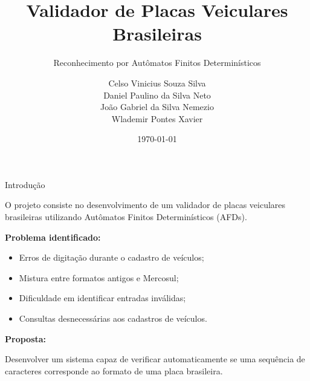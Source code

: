 \documentclass[aspectratio=169,12pt]{beamer}
\title[Validador de Placas]{Validador de Placas Veiculares Brasileiras}
\subtitle{Reconhecimento por Autômatos Finitos Determinísticos}
\author{
    Celso Vinicius Souza Silva \\
    Daniel Paulino da Silva Neto \\
    João Gabriel da Silva Nemezio \\
    Wlademir Pontes Xavier
}
\institute{Ciência da Computação}
\date{\today}
\begin{document}

\begin{frame}
    \titlepage
\end{frame}


\begin{frame}{Introdução}

    O projeto consiste no desenvolvimento de um validador
    de placas veiculares brasileiras utilizando
    Autômatos Finitos Determinísticos (AFDs).

    \vspace{0.4cm}

    \textbf{Problema identificado:}

    \begin{itemize}
        \item Erros de digitação durante o cadastro de veículos;
        \item Mistura entre formatos antigos e Mercosul;
        \item Dificuldade em identificar entradas inválidas;
        \item Consultas desnecessárias aos cadastros de veículos.
    \end{itemize}

    \vspace{0.3cm}

    \textbf{Proposta:}

    Desenvolver um sistema capaz de verificar automaticamente
    se uma sequência de caracteres corresponde ao formato
    de uma placa brasileira.

\end{frame}

\end{document}
